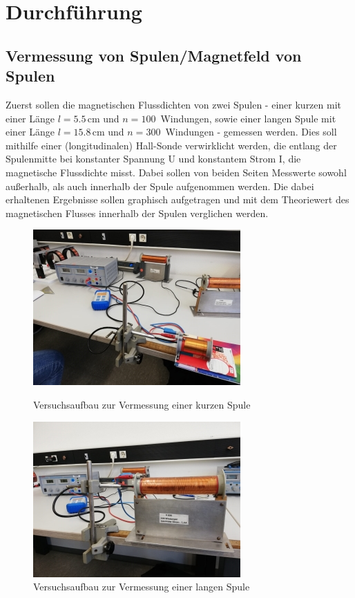 \section{Durchführung}
\label{sec:Durchführung}

\subsection{Vermessung von Spulen/Magnetfeld von Spulen}

Zuerst sollen die magnetischen Flussdichten von zwei Spulen - einer kurzen mit einer Länge 
$l = 5.5\, \si{\centi\meter}$ und $n = 100\,$ Windungen, sowie einer langen Spule mit einer Länge
$l = 15.8\, \si{\cm}$ und $n = 300\,$ Windungen - gemessen werden. Dies soll mithilfe einer
(longitudinalen) Hall-Sonde verwirklicht werden, die entlang der Spulenmitte bei konstanter Spannung U und konstantem
Strom I, die magnetische Flussdichte misst. Dabei sollen von beiden Seiten Messwerte sowohl außerhalb, als auch
innerhalb der Spule aufgenommen werden.
Die dabei erhaltenen Ergebnisse sollen graphisch aufgetragen und mit dem Theoriewert des magnetischen Flusses
innerhalb der Spulen verglichen werden.

\begin{figure}[H]
    \centering
    \includegraphics{content/Spule2.jpg}
    \caption{Versuchsaufbau zur Vermessung einer kurzen Spule }
    \label{KurzeSpule}
    \includegraphics{content/Spule1.jpg}
    \caption{Versuchsaufbau zur Vermessung einer langen Spule }
    \label{LangeSpule}
\end{figure}


